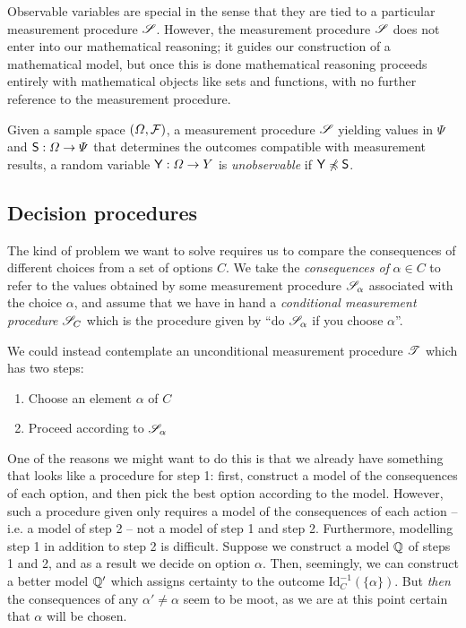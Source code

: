Observable variables are special in the sense that they are tied to a particular measurement procedure $\mathscr{S}$. However, the measurement procedure $\mathscr{S}$ does not enter into our mathematical reasoning; it guides our construction of a mathematical model, but once this is done mathematical reasoning proceeds entirely with mathematical objects like sets and functions, with no further reference to the measurement procedure.

\begin{definition}\label{def:unobserved_variable}
Given a sample space $(\Omega,\mathcal{F})$, a measurement procedure $\mathscr{S}$ yielding values in $\Psi$ and $\mathsf{S}:\Omega\to\Psi$ that determines the outcomes compatible with measurement results, a random variable $\mathsf{Y}:\Omega\to Y$ is \emph{unobservable} if $\mathsf{Y}\not\preccurlyeq \mathsf{S}$.
\end{definition}

\subsection{Decision procedures}\label{sec:actions}

The kind of problem we want to solve requires us to compare the consequences of different choices from a set of options $C$. We take the \emph{consequences of} $\alpha\in C$ to refer to the values obtained by some measurement procedure $\mathscr{S}_\alpha$ associated with the choice $\alpha$, and assume that we have in hand a \emph{conditional measurement procedure} $\mathscr{S}_C$ which is the procedure given by ``do $\mathscr{S}_\alpha$ if you choose $\alpha$''.

We could instead contemplate an unconditional measurement procedure $\mathscr{T}$ which has two steps:
\begin{enumerate}
    \item Choose an element $\alpha$ of $C$
    \item Proceed according to $\mathscr{S}_\alpha$
\end{enumerate}
One of the reasons we might want to do this is that we already have something that looks like a procedure for step 1: first, construct a model of the consequences of each option, and then pick the best option according to the model. However, such a procedure given only requires a model of the consequences of each action -- i.e. a model of step 2 -- not a model of step 1 and step 2. Furthermore, modelling step 1 in addition to step 2 is difficult. Suppose we construct a model $\mathbb{Q}$ of steps 1 and 2, and as a result we decide on option $\alpha$. Then, seemingly, we can construct a better model $\mathbb{Q}'$ which assigns certainty to the outcome $\mathrm{Id}_C^{-1}(\{\alpha\})$. But \emph{then} the consequences of any $\alpha'\neq \alpha$ seem to be moot, as we are at this point certain that $\alpha$ will be chosen.

